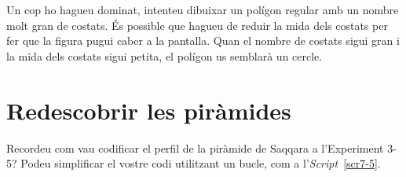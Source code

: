 \vspace*{3mm}

Un cop ho hagueu dominat, intenteu dibuixar un polígon regular amb un nombre molt gran de costats. És possible que hagueu de reduir la mida dels costats per fer que la figura pugui caber a la pantalla. Quan el nombre de costats sigui gran i la mida dels costats sigui petita, el polígon us semblarà un cercle.

\section{Redescobrir les piràmides}
Recordeu com vau codificar el perfil de la piràmide de Saqqara a l'Experiment 3-5? Podeu simplificar el vostre codi utilitzant un bucle, com a l'\emph{Script}~\ref{scr7-5}.


